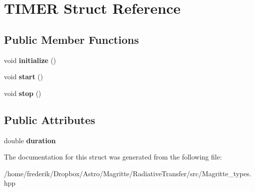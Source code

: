 \hypertarget{structTIMER}{}\section{T\+I\+M\+ER Struct Reference}
\label{structTIMER}
\subsection*{Public Member Functions}
\begin{DoxyCompactItemize}
\item 
\mbox{\label{structTIMER_a55f3ff33c4d06c5a13d6e8f2d155aa69}} 
void {\bfseries initialize} ()
\item 
\mbox{\label{structTIMER_ab32c9692daffab03c61dff31994a4948}} 
void {\bfseries start} ()
\item 
\mbox{\label{structTIMER_a5ffda48b39188174bbfb287923e8c01e}} 
void {\bfseries stop} ()
\end{DoxyCompactItemize}
\subsection*{Public Attributes}
\begin{DoxyCompactItemize}
\item 
\mbox{\label{structTIMER_ae0e8444b0fa959e137167f6ad1f987bb}} 
double {\bfseries duration}
\end{DoxyCompactItemize}


The documentation for this struct was generated from the following file\+:\begin{DoxyCompactItemize}
\item 
/home/frederik/\+Dropbox/\+Astro/\+Magritte/\+Radiative\+Transfer/src/Magritte\+\_\+types.\+hpp\end{DoxyCompactItemize}
